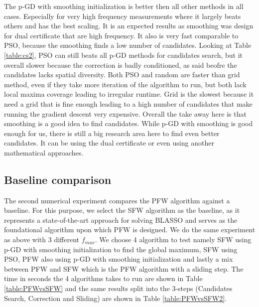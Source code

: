 \documentclass[a4paper,12pt,oneside]{report}
\theoremstyle{named}
\begin{document}
The p-GD with smoothing initialization is better then all other methods in all cases. Especially for very high frequency measurements where it largely beats others and has the best scaling. It is an expected results as smoothing was design for dual certificate that are high frequency. It also is very fast comparable to PSO, because the smoothing finds a low number of candidates.  Looking at Table \ref{table:cs2}, PSO can still beats all p-GD methods for candidates search, but it overall slower because the correction is badly conditioned, as said beofre the candidates lacks spatial diversity. Both PSO and random are faster than grid method, even if they take more iteration of the algorithm to run, but both lack local maxima coverage leading to irregular runtime. Grid is the slowest because it need a grid that is fine enough leading to a high number of candidates that make running the gradient descent very expensive. Overall the take away here is that smoothing is a good idea to find candidates. While  p-GD with smoothing is good enough for us, there is still a big research area here to find even better candidates. It can be using the dual certificate or even using another mathematical approaches.

\subsection{Baseline comparison}
The second numerical experiment compares the PFW algorithm against a baseline. For this purpose, we select the SFW algorithm as the baseline, as it represents a state-of-the-art approach for solving BLASSO and serves as the foundational algorithm upon which PFW is designed. We do the same experiment as above with 3 different $f_{max}$. We choose 4 algorithm to test namely SFW using p-GD with smoothing initialization to find the global maximum, SFW using PSO, PFW also using p-GD with smoothing initialization and lastly a mix between PFW and SFW which is the PFW algorithm with a sliding step. The time in seconds the 4 algorithms takes to run are shown in Table \ref{table:PFWvsSFW} and the same results split into the 3-steps (Candidates
Search, Correction and Sliding) are shown in Table \ref{table:PFWvsSFW2}.\\
\end{document}
